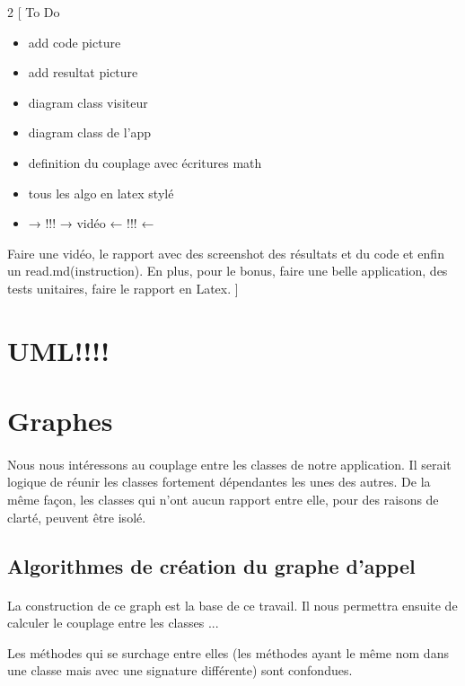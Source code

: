 \documentclass[a4paper]{article}
\begin{document}
    \newpage
    \begin{multicols}{2}
        [
            To Do
            \begin{itemize}
                \item add code picture 
                \item add resultat picture
                \item diagram class visiteur
                \item diagram class de l'app
                \item definition du couplage avec écritures math
                \item tous les algo en latex stylé
                \item → !!! → vidéo ← !!! ← 
            \end{itemize}
            Faire une vidéo, le rapport avec des screenshot des résultats et du code et enfin un read.md(instruction). En plus, pour le bonus, faire une belle application, des tests unitaires, faire le rapport en Latex.
        ]
        \section{UML!!!!}

        \section{Graphes}
        \paragraph{} 
        Nous nous intéressons au couplage entre les classes de notre application. Il serait logique de réunir les classes fortement dépendantes les unes des autres. De la même façon, les classes qui n'ont aucun rapport entre elle, pour des raisons de clarté, peuvent être isolé.
        \subsection{Algorithmes de création du graphe d'appel}
        \paragraph{} La construction de ce graph est la base de ce travail. Il nous permettra ensuite de calculer le couplage entre les classes ...

        Les méthodes qui se surchage entre elles (les méthodes ayant le même nom dans une classe mais avec une signature différente) sont confondues.

\end{multicols}
\end{document}
